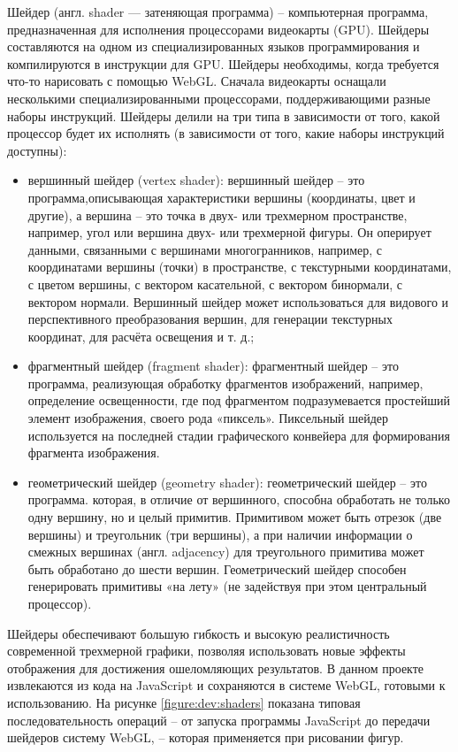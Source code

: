 Шейдер (англ. shader — затеняющая программа) -- компьютерная программа, предназначенная для исполнения процессорами видеокарты (GPU).
Шейдеры составляются на одном из специализированных языков программирования и компилируются в инструкции для GPU. Шейдеры необходимы, когда требуется что-то нарисовать
с помощью WebGL. 
Сначала видеокарты оснащали несколькими специализированными процессорами, поддерживающими разные наборы инструкций. Шейдеры делили на три типа в зависимости от того,
какой процессор будет их исполнять (в зависимости от того, какие наборы инструкций доступны):
\begin{itemize}
\item вершинный шейдер (vertex shader): вершинный шейдер -- это программа,описывающая характеристики вершины (координаты, цвет и другие), а вершина – это точка в двух- или 
трехмерном пространстве, например, угол или вершина двух- или трехмерной фигуры. Он оперирует данными, связанными с вершинами многогранников, например, с координатами вершины 
(точки) в пространстве, с текстурными координатами, с цветом вершины, с вектором касательной, с вектором бинормали, с вектором нормали. Вершинный шейдер может использоваться 
для видового и перспективного преобразования вершин, для генерации текстурных координат, для расчёта освещения и т. д.;
\item фрагментный шейдер (fragment shader): фрагментный шейдер -- это программа, реализующая обработку фрагментов изображений, например, определение освещенности, где под
фрагментом подразумевается простейший элемент изображения, своего рода «пиксель». Пиксельный шейдер используется на последней стадии графического конвейера для формирования фрагмента изображения.
\item геометрический шейдер (geometry shader): геометрический шейдер -- это программа. которая, в отличие от вершинного, способна обработать не только одну вершину, но и целый примитив. 
Примитивом может быть отрезок (две вершины) и треугольник (три вершины), а при наличии информации о смежных вершинах (англ. adjacency) для треугольного примитива может быть обработано до шести вершин. Геометрический шейдер 
способен генерировать примитивы «на лету» (не задействуя при этом центральный процессор).
\end{itemize}

Шейдеры обеспечивают большую гибкость и высокую реалистичность современной трехмерной графики, позволяя использовать новые эффекты отображения для достижения ошеломляющих
результатов. В данном проекте извлекаются из кода на JavaScript и сохраняются в системе WebGL, готовыми к использованию. На рисунке \ref{figure:dev:shaders} показана типовая последовательность
операций – от запуска программы JavaScript до передачи шейдеров систему WebGL, – которая применяется при рисовании фигур.

